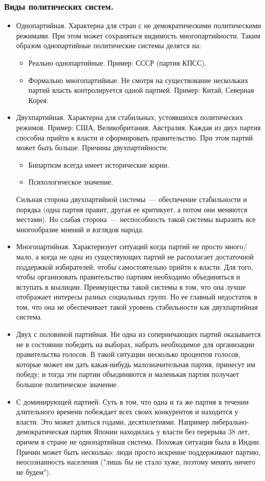 \documentclass[12pt]{article}
\begin{document}
	\subsubsection{Виды политических систем.}
	\begin{itemize}
		\item Однопартийная. Характерна для стран с не демократическими политическими режимами. При этом может сохраняться видимость многопартийности. Таким образом однопартийные политические системы делятся на:
		\begin{itemize}
			\item Реально однопартийные. Пример: СССР (партия КПСС).
			\item Формально многопартийные. Не смотря на существование нескольких партий власть контролируется одной партией. Пример: Китай, Северная Корея.
		\end{itemize}
		\item Двухпартийная. Характерна для стабильных, устоявшихся политических режимов. Пример: США, Великобритания, Австралия. Каждая из двух партия способна прийти к власти и сформировать правительство. При этом партий может быть больше. Причины двухпартийности:
		\begin{itemize}
			\item Бипартизм всегда имеет исторические корни.
			\item Психологическое значение.
		\end{itemize}
		Сильная сторона двухпартийной системы~--- обеспечение стабильности и порядка (одна партия правит, другая ее критикует, а потом они меняются местами). Но слабая сторона~--- неспособность такой системы выразить все многообразие мнений и взглядов народа.
		\item Многопартийная. Характеризует ситуаций когда партий не просто много/мало, а когда не одна из существующих партий не располагает достаточной поддержкой избирателей, чтобы самостоятельно прийти к власти. Для того, чтобы организовать правительство партиям необходимо объединяться и вступать в коалиции. Преимущества такой системы в том, что она лучше отображает интересы разных социальных групп. Но ее главный недостаток в том, что она не обеспечивает такой уровень стабильности как двухпартийная система.
		\item Двух с половиной партийная. Ни одна из соперничающих партий оказывается не в состоянии победить на выборах, набрать необходимое для организации правительства голосов. В такой ситуации несколько процентов голосов, которые может им дать какая-нибудь малозначительная партия, принесут им победу; и тогда эти партии объединяются и маленькая партия получает большое политическое значение.
		\item С доминирующей партией. Суть в том, что одна и та же партия в течении длительного времени побеждает всех своих конкурентов и находится у власти. Это может длиться годами, десятилетиями. Например либерально-демократическая партия Японии находилась у власти без перерыва $38$ лет, причем в стране не однопартийная система. Похожая ситуация была в Индии. Причин может быть несколько: люди просто искренне поддерживают партию, неосознанность населения ("лишь бы не стало хуже, поэтому менять ничего не будем").
	\end{itemize}
\end{document}
